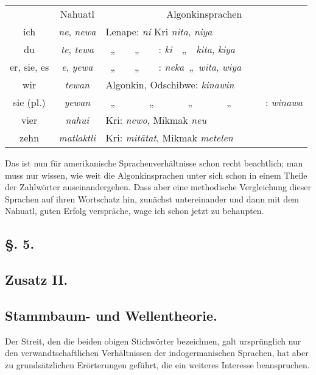 \label{sp.163}

\begin{table}[h]
\centering
\begin{tabular}{ c || c | l} 
\lsptoprule
& Nahuatl & \multicolumn{1}{c}{Algonkinsprachen}\\
\lsptoprule
ich & \textit{ne}, \textit{newa} & Lenape: \textit{ni} Kri \textit{nita}, \textit{niya}\\
du & \textit{te}, \textit{tewa} &~„~~~~„~~~~: \textit{ki}~~„~~\textit{kita}, \textit{kiya}\\
er, sie, es & \textit{e}, \textit{yewa} &~„~~~~„~~~~: \textit{neka}~„~\textit{wita}, \textit{wiya}\\
wir & \textit{tewan} & Algonkin, Odschibwe: \textit{kinawin}\\
sie (pl.) & \textit{yewan} &~„~~~~~~~„~~~~~~~„~~~~~~~„~~~~~~~: \textit{winawa}\\
vier & \textit{nahui} & Kri: \textit{newo}, Mikmak \textit{neu}\\
zehn & \textit{matlaktli} & Kri: \textit{mitātat}, Mikmak \textit{metelen}\\
\end{tabular}
\end{table}

Das ist nun für amerikanische Sprachenverhältnisse schon recht beachtlich; man muss nur wissen, wie weit die Algonkinsprachen unter sich schon in einem Theile der Zahlwörter auseinandergehen. Dass aber eine methodische Vergleichung dieser Sprachen auf ihren Wortschatz hin, zunächst untereinander und dann mit dem Nahuatl, guten Erfolg verspräche, wage ich schon jetzt zu behaupten.

\subsection*{§. 5.}\label{III.I.I.5}
\subsection*{Zusatz II.}
\subsection*{Stammbaum- und Wellentheorie.}
\largerpage[-2]Der Streit, den die beiden obigen Stichwörter bezeichnen, galt ursprünglich nur den verwandtschaftlichen Verhältnissen der indogermanischen Sprachen, hat aber zu grundsätzlichen Erörterungen geführt, die ein weiteres Interesse beanspruchen.

